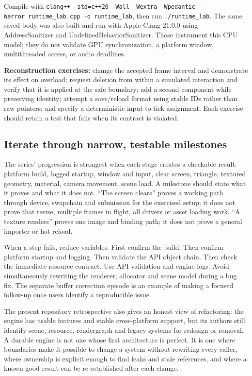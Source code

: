 Compile with \texttt{clang++\ -std=c++20\ -Wall\ -Wextra\ -Wpedantic\ -Werror\ runtime\_lab.cpp\ -o\ runtime\_lab}, then run \texttt{./runtime\_lab}. The same saved body was also built and run with Apple Clang 21.0.0 using AddressSanitizer and UndefinedBehaviorSanitizer. Those instrument this CPU model; they do not validate GPU synchronization, a platform window, multithreaded access, or audio deadlines.

\textbf{Reconstruction exercises:} change the accepted frame interval and demonstrate its effect on overload; request deletion from within a simulated interaction and verify that it is applied at the safe boundary; add a second component while preserving identity; attempt a save/reload format using stable IDs rather than raw pointers; and specify a deterministic input-to-tick assignment. Each exercise should retain a test that fails when its contract is violated.

\subsection{Iterate through narrow, testable milestones}\label{06-engine-ii-ch042-iterate-through-narrow-testable-milestones}

The series' progression is strongest when each stage creates a checkable result: platform build, logged startup, window and input, clear screen, triangle, textured geometry, material, camera movement, scene load. A milestone should state what it proves and what it does not. ``The screen clears'' proves a working path through device, swapchain and submission for the exercised setup; it does not prove that resize, multiple frames in flight, all drivers or asset loading work. ``A texture renders'' proves one image and binding path; it does not prove a general importer or hot reload.

When a step fails, reduce variables. First confirm the build. Then confirm platform startup and logging. Then validate the API object chain. Then check the immediate resource contract. Use API validation and engine logs. Avoid simultaneously rewriting the renderer, allocator and scene model during a bug fix. The separate buffer correction episode is an example of making a focused follow-up once users identify a reproducible issue.

The present repository retrospective also gives an honest view of refactoring: the engine has usable features and stable cross-platform support, but its authors still identify scene, resource, rendergraph and legacy systems for redesign or removal. A durable engine is not one whose first architecture is perfect. It is one where boundaries make it possible to change a system without rewriting every caller, where ownership is explicit enough to find leaks and stale references, and where a known-good result can be re-established after each change.

